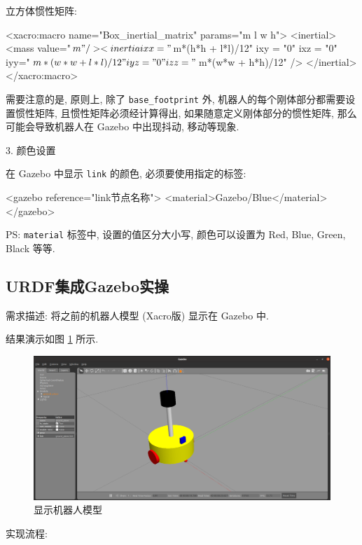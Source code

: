 \documentclass[openany, fontset=windowsold]{ctexbook}
\theoremstyle{kaiti}
\theoremstyle{normal}
\begin{document}
立方体惯性矩阵:

\begin{xml}
  <xacro:macro name="Box_inertial_matrix" params="m l w h">
    <inertial>
            <mass value="${m}" />
            <inertia ixx="${m*(h*h + l*l)/12}" ixy = "0" ixz = "0"
                iyy="${m*(w*w + l*l)/12}" iyz= "0"
                izz="${m*(w*w + h*h)/12}" />
    </inertial>
  </xacro:macro>
\end{xml}

需要注意的是, 原则上, 除了 \verb|base_footprint| 外, 机器人的每个刚体部分都需要设置惯性矩阵, 且惯性矩阵必须经计算得出, 如果随意定义刚体部分的惯性矩阵, 那么可能会导致机器人在 Gazebo 中出现抖动, 移动等现象.

3. 颜色设置

在 Gazebo 中显示 \verb|link| 的颜色, 必须要使用指定的标签:

\begin{xml}
  <gazebo reference="link节点名称">
      <material>Gazebo/Blue</material>
  </gazebo>
\end{xml}

PS: \verb|material| 标签中, 设置的值区分大小写, 颜色可以设置为 Red, Blue, Green, Black 等等.

\subsection{URDF集成Gazebo实操}

需求描述: 将之前的机器人模型 (Xacro版) 显示在 Gazebo 中.

结果演示如图 \ref{fig:ros_sim_show_robot_copy} 所示.

\begin{figure}[!ht]
  \centering
  \includegraphics[width=.9\textwidth]{ros_sim_show_robot.png}
  \caption{显示机器人模型}
  \label{fig:ros_sim_show_robot_copy}
\end{figure}

实现流程:
\end{document}
